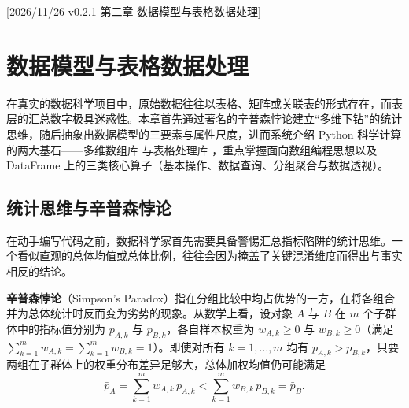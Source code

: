 %
%
[2026/11/26 v0.2.1 第二章 数据模型与表格数据处理]
\chapter{数据模型与表格数据处理}\label{ch:tabular-data}

在真实的数据科学项目中，原始数据往往以表格、矩阵或关联表的形式存在，而表层的汇总数字极具迷惑性。本章首先通过著名的辛普森悖论建立“多维下钻”的统计思维，随后抽象出数据模型的三要素与属性尺度，进而系统介绍 Python 科学计算的两大基石——多维数组库  与表格处理库 ，重点掌握面向数组编程思想以及 DataFrame 上的三类核心算子（基本操作、数据查询、分组聚合与数据透视）。

\section{统计思维与辛普森悖论}\label{sec:simpson-paradox}

在动手编写代码之前，数据科学家首先需要具备警惕汇总指标陷阱的统计思维。一个看似直观的总体均值或总体比例，往往会因为掩盖了关键混淆维度而得出与事实相反的结论。

\begin{definition}[辛普森悖论]\label{def:simpson-paradox}
\textbf{辛普森悖论}（Simpson's Paradox）指在分组比较中均占优势的一方，在将各组合并为总体统计时反而变为劣势的现象。从数学上看，设对象 $A$ 与 $B$ 在 $m$ 个子群体中的指标值分别为 $p_{A,k}$ 与 $p_{B,k}$，各自样本权重为 $w_{A,k}\ge 0$ 与 $w_{B,k}\ge 0$（满足 $\sum_{k=1}^{m} w_{A,k} = \sum_{k=1}^{m} w_{B,k} = 1$）。即使对所有 $k=1,\dots,m$ 均有 $p_{A,k} > p_{B,k}$，只要两组在子群体上的权重分布差异足够大，总体加权均值仍可能满足
\begin{equation}\label{eq:simpson-ineq}
  \bar{p}_A = \sum_{k=1}^{m} w_{A,k}\,p_{A,k} < \sum_{k=1}^{m} w_{B,k}\,p_{B,k} = \bar{p}_B.
\end{equation}
\end{definition}

